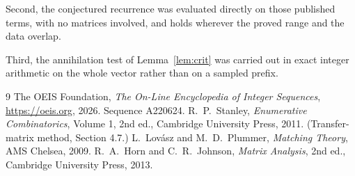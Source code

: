 \documentclass[11pt,a4paper]{article}
\theoremstyle{plain}
\theoremstyle{definition}
\begin{document}
Second, the conjectured recurrence was evaluated directly on those published terms, with no
matrices involved, and holds wherever the proved range and the data overlap.

Third, the annihilation test of Lemma~\ref{lem:crit} was carried out in exact integer
arithmetic on the whole vector rather than on a sampled prefix.

\begin{thebibliography}{9}
 The OEIS Foundation, \emph{The On-Line Encyclopedia of Integer
Sequences}, \url{https://oeis.org}, 2026. Sequence A220624.
 R.~P.~Stanley, \emph{Enumerative Combinatorics}, Volume 1, 2nd ed.,
Cambridge University Press, 2011. (Transfer-matrix method, Section 4.7.)
 L.~Lov\'asz and M.~D.~Plummer, \emph{Matching Theory}, AMS Chelsea,
2009.
 R.~A.~Horn and C.~R.~Johnson, \emph{Matrix Analysis}, 2nd ed., Cambridge
University Press, 2013.
\end{thebibliography}
\end{document}
